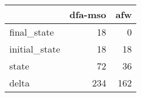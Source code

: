 \begin{tabular}{lrr}
\toprule
{} &  dfa-mso &  afw \\
\midrule
final\_state   &       18 &    0 \\
initial\_state &       18 &   18 \\
state         &       72 &   36 \\
delta         &      234 &  162 \\
\bottomrule
\end{tabular}
